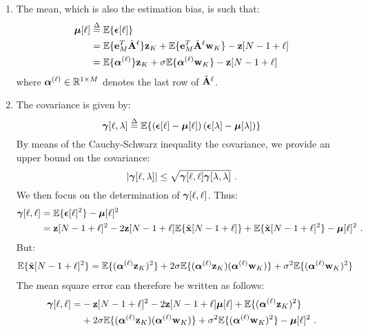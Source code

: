 \begin{enumerate}
\item 
The mean, which is also the estimation bias, is such that: 
\begin{align}
\nonumber
\boldsymbol{\mu}[\ell]&\overset{\Delta}{=}{\mathbb E}\{\boldsymbol{\epsilon}[\ell]\} \\
\nonumber
&= {\mathbb E}\{{\mathbf e}_M^T\tilde{{\mathbf A}}^\ell\}{\mathbf z}_{K} + {\mathbb E}\{{\mathbf e}_M^T\tilde{{\mathbf A}}^\ell{\mathbf w}_{K}\} - {\mathbf z}[N-1+\ell] \\
&=  {\mathbb E}\{\boldsymbol{\alpha}^{(\ell)}\}{\mathbf z}_{K} + \sigma{\mathbb E}\{\boldsymbol{\alpha}^{(\ell)}{\mathbf w}_{K}\} - {\mathbf z}[N-1+\ell]
\label{eq:bias.1}
\end{align}
where $\boldsymbol{\alpha}^{(\ell)}\in{\mathbb R}^{1\times M}$ denotes the last row of $\tilde{{\mathbf A}}^\ell$.

\item 
The covariance is given by:
\begin{equation*}
\boldsymbol{\gamma}[\ell,\lambda] \overset{\Delta}{=} {\mathbb E}\{\left(\boldsymbol{\epsilon}[\ell]-\boldsymbol{\mu}[\ell]\right)\left(\boldsymbol{\epsilon}[\lambda]-\boldsymbol{\mu}[\lambda]\right)\} 
\end{equation*}
By means of the Cauchy-Schwarz inequality the covariance, we provide an upper bound on the covariance:  
\begin{equation}
\left|\boldsymbol{\gamma}[\ell,\lambda]\right| \leq \sqrt{\boldsymbol{\gamma}[\ell,\ell]\boldsymbol{\gamma}[\lambda,\lambda]}\ .
\end{equation}
We then focus on the determination of $\boldsymbol{\gamma}[\ell,\ell]$. Thus:
\begin{align*}  
\boldsymbol{\gamma}[\ell,\ell] &= {\mathbb E}\{\boldsymbol{\epsilon}[\ell]^2\} - \boldsymbol{\mu}[\ell]^2 \\
&={\mathbf z}[N-1+\ell]^2 - 2{\mathbf z}[N-1+\ell] {\mathbb E}\{\tilde{{\mathbf x}}[N-1+\ell]\} + {\mathbb E}\{\tilde{{\mathbf x}}[N-1+\ell]^2\} - \boldsymbol{\mu}[\ell]^2 \ .
\end{align*}
But:
\begin{align*}
{\mathbb E}\{\tilde{{\mathbf x}}[N-1+\ell]^2\} &= {\mathbb E}\{(\boldsymbol{\alpha}^{(\ell)}{\mathbf z}_K)^2\} + 2\sigma{\mathbb E}\{(\boldsymbol{\alpha}^{(\ell)}{\mathbf z}_K)(\boldsymbol{\alpha}^{(\ell)}{\mathbf w}_K)\} + \sigma^2{\mathbb E}\{(\boldsymbol{\alpha}^{(\ell)}{\mathbf w}_K)^2\}
\end{align*}
The mean square error can therefore be written as follows:
\begin{align}
\nonumber
\boldsymbol{\gamma}[\ell,\ell] =&-{\mathbf z}[N-1+\ell]^2 -2{\mathbf z}[N-1+\ell]\boldsymbol{\mu}[\ell] +{\mathbb E}\{(\boldsymbol{\alpha}^{(\ell)}{\mathbf z}_K)^2\}  \\
&+ 2\sigma{\mathbb E}\{(\boldsymbol{\alpha}^{(\ell)}{\mathbf z}_K)(\boldsymbol{\alpha}^{(\ell)}{\mathbf w}_K)\} + \sigma^2{\mathbb E}\{(\boldsymbol{\alpha}^{(\ell)}{\mathbf w}_K)^2\} - \boldsymbol{\mu}[\ell]^2\ .
\end{align}
\end{enumerate}

